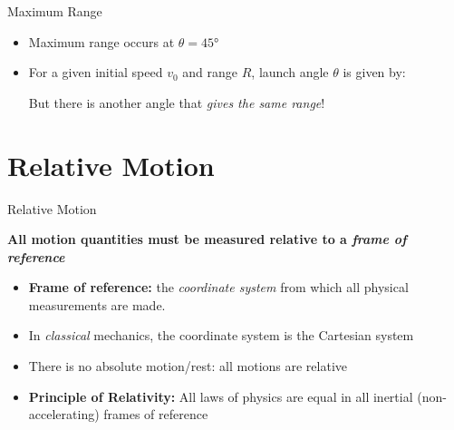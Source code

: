 \documentclass[12pt,compress,aspectratio=169,dvipsnames]{beamer}
\begin{document}
\begin{frame}{Maximum Range}
  
  \begin{itemize}
  \item Maximum range occurs at $\theta=\ang{45}$
  \item For a given initial speed $v_0$ and range $R$, launch angle $\theta$ is
    given by:
    

    But there is another angle that \emph{gives the same range}!

  \end{itemize}
\end{frame}



\section{Relative Motion}

\begin{frame}{Relative Motion}
  
  \begin{block}{}
    \textbf{All motion quantities must be measured relative to a
      \emph{frame of reference}}
  \end{block}

  \vspace{.2in}
  \begin{itemize}
  \item\textbf{Frame of reference:} the \emph{coordinate system} from which all
    physical measurements are made.
  \item In \emph{classical} mechanics, the coordinate system is the
    Cartesian system
  \item There is no absolute motion/rest: all motions are relative
  \item\textbf{Principle of Relativity:} All laws of physics are equal in all
    inertial (non-accelerating) frames of reference
  \end{itemize}
\end{frame}  
\end{document}
